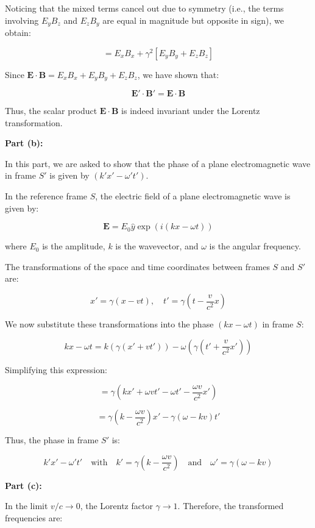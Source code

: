 Noticing that the mixed terms cancel out due to symmetry (i.e., the terms involving \( E_y B_z \) and \( E_z B_y \) are equal in magnitude but opposite in sign), we obtain:

\[
= E_x B_x + \gamma^2 \left[ E_y B_y + E_z B_z \right]
\]

Since \( \mathbf{E} \cdot \mathbf{B} = E_x B_x + E_y B_y + E_z B_z \), we have shown that:

\[
\mathbf{E'} \cdot \mathbf{B'} = \mathbf{E} \cdot \mathbf{B}
\]

Thus, the scalar product \( \mathbf{E} \cdot \mathbf{B} \) is indeed invariant under the Lorentz transformation.

\textbf{Part (b):}

In this part, we are asked to show that the phase of a plane electromagnetic wave in frame \( S' \) is given by \( (k' x' - \omega' t') \).

In the reference frame \( S \), the electric field of a plane electromagnetic wave is given by:

\[
\mathbf{E} = E_0 \hat{y} \exp \left( i (k x - \omega t) \right)
\]

where \( E_0 \) is the amplitude, \( k \) is the wavevector, and \( \omega \) is the angular frequency.

The transformations of the space and time coordinates between frames \( S \) and \( S' \) are:

\[
x' = \gamma (x - vt), \quad t' = \gamma \left( t - \frac{v}{c^2} x \right)
\]

We now substitute these transformations into the phase \( (k x - \omega t) \) in frame \( S \):

\[
k x - \omega t = k \left( \gamma (x' + v t') \right) - \omega \left( \gamma \left( t' + \frac{v}{c^2} x' \right) \right)
\]

Simplifying this expression:

\[
= \gamma \left( k x' + \omega v t' - \omega t' - \frac{\omega v}{c^2} x' \right)
\]

\[
= \gamma \left( k - \frac{\omega v}{c^2} \right) x' - \gamma (\omega - kv) t'
\]

Thus, the phase in frame \( S' \) is:

\[
k' x' - \omega' t' \quad \text{with} \quad k' = \gamma \left( k - \frac{\omega v}{c^2} \right) \quad \text{and} \quad \omega' = \gamma (\omega - k v)
\]

\textbf{Part (c):}

In the limit \( v/c \to 0 \), the Lorentz factor \( \gamma \to 1 \). Therefore, the transformed frequencies are:

